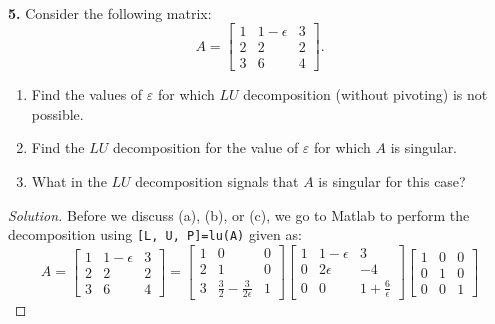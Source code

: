 \documentclass[12pt]{amsart}
\newenvironment{solution}
{\begin{proof}[Solution]}
{\end{proof}}
\begin{document}
\begin{onehalfspace}
        \quad\\
        \noindent\textbf{5.} Consider the following matrix:
        \begin{displaymath}
            A = \left[\begin{matrix}
                          1 & 1-\epsilon & 3\\
                          2 & 2 & 2 \\
                          3 & 6 & 4
            \end{matrix}\right].
        \end{displaymath}
        \begin{enumerate}[label=(\alph*)]
            \item Find the values of $\varepsilon$ for which $LU$ decomposition (without pivoting) is not possible.
            \item Find the $LU$ decomposition for the value of $\varepsilon$ for which $A$ is singular.
            \item What in the $LU$ decomposition signals that $A$ is singular for this case?
        \end{enumerate}
        \begin{solution}
            Before we discuss (a), (b), or (c), we go to Matlab to perform the decomposition using
            \texttt{[L, U, P]=lu(A)} given as:
            \begin{displaymath}
                A = \left[\begin{matrix}
                              1 & 1-\epsilon & 3\\
                              2 & 2 & 2 \\
                              3 & 6 & 4
                \end{matrix}\right]
                = \left[\begin{matrix}
                            1 & 0 & 0\\
                            2 & 1 & 0\\
                            3 & \frac{3}{2}-\frac{3}{2\epsilon} & 1
                \end{matrix}\right]
                \left[\begin{matrix}
                          1 & 1 - \epsilon & 3\\
                          0 & 2\epsilon & -4\\
                          0 & 0 & 1 +\frac{6}{\epsilon}
                \end{matrix}\right]
                \left[\begin{matrix}
                          1 & 0 & 0\\
                          0 & 1 & 0\\
                          0 & 0 & 1
                \end{matrix}\right]
            \end{displaymath}


\end{solution}
\end{onehalfspace}
\end{document}
